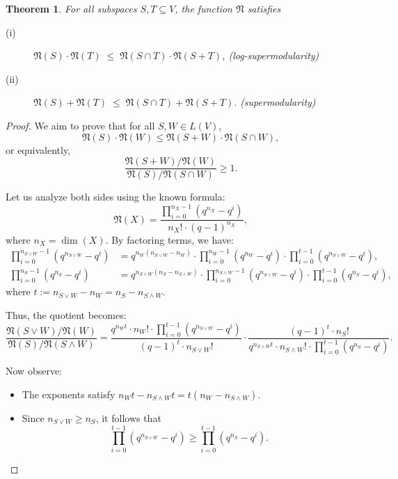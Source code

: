 \documentclass[10pt,a4paper]{amsart}
\newtheorem{theorem}{Theorem}
\begin{document}
\begin{theorem}\label{thm:supermodular}
For all subspaces $S,T \subseteq V$, the function $\mathfrak N$ satisfies
\begin{description}
     \item[(i)] $\mathfrak N(S) \cdot \mathfrak N(T)
\;\le\;
\mathfrak N(S \cap T) \cdot \mathfrak N(S + T)$, \quad (log-supermodularity)
\item[(ii)] $\mathfrak N(S) + \mathfrak N(T)
\;\le\;
\mathfrak N(S \cap T) + \mathfrak N(S + T).$ \quad (supermodularity)
\end{description}
    

\end{theorem}

\begin{proof}
    \item[(i)] We aim to prove that for all \( S, W \in L(V) \),
		\[
		\mathfrak{N}(S) \cdot \mathfrak{N}(W) \leq \mathfrak{N}(S + W) \cdot \mathfrak{N}(S \cap W),
		\]
		or equivalently,
		\[
		\frac{\mathfrak{N}(S + W)/\mathfrak{N}(W)}{\mathfrak{N}(S)/\mathfrak{N}(S \cap W)} \geq 1.
		\]
		
		Let us analyze both sides using the known formula:
		\[
		\mathfrak{N}(X) = \frac{\prod_{i=0}^{n_X - 1}(q^{n_X} - q^i)}{n_X! \cdot (q - 1)^{n_X}},
		\]
		where \( n_X = \dim(X) \). By factoring terms, we have:
		\begin{align*}
		\prod_{i=0}^{n_{S \vee W} - 1}(q^{n_{S \vee W}} - q^i)
		&= q^{n_W(n_{S \vee W} - n_W)} \cdot \prod_{i=0}^{n_W - 1}(q^{n_W} - q^i) \cdot \prod_{i=0}^{t - 1}(q^{n_{S \vee W}} - q^i), \\
		\prod_{i=0}^{n_S - 1}(q^{n_S} - q^i)
		&= q^{n_{S \wedge W}(n_S - n_{S \wedge W})} \cdot \prod_{i=0}^{n_{S \wedge W} - 1}(q^{n_{S \wedge W}} - q^i) \cdot \prod_{i=0}^{t - 1}(q^{n_S} - q^i),
		\end{align*}
		where \( t := n_{S \vee W} - n_W = n_S - n_{S \wedge W} \).
		
		Thus, the quotient becomes:
		\[
		\frac{\mathfrak{N}(S \vee W)/\mathfrak{N}(W)}{\mathfrak{N}(S)/\mathfrak{N}(S \wedge W)} = 
		\frac{
			q^{n_W t} \cdot n_W! \cdot \prod_{i=0}^{t - 1}(q^{n_{S \vee W}} - q^i)
		}{
			(q - 1)^t \cdot n_{S \vee W}!
		}
		\cdot
		\frac{
			(q - 1)^t \cdot n_S!
		}{
			q^{n_{S \wedge W} t} \cdot n_{S \wedge W}! \cdot \prod_{i=0}^{t - 1}(q^{n_S} - q^i)
		}.
		\]
		
		Now observe:
		\begin{itemize}
			\item The exponents satisfy \( n_W t - n_{S \wedge W} t = t(n_W - n_{S \wedge W}) \).
			\item Since \( n_{S \vee W} \geq n_S \), it follows that
			\[
			\prod_{i=0}^{t - 1}(q^{n_{S \vee W}} - q^i) \geq \prod_{i=0}^{t - 1}(q^{n_S} - q^i).
			\]
		\end{itemize}
		

\end{proof}
\end{document}
